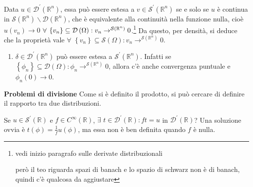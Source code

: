 \documentclass{article}
\begin{document}
Data $u\in \mathcal{D}^{\prime }\left( 
\mathbb{R}
^{n}\right) $, essa pu\`{o} essere estesa a $v\in \mathcal{S}^{\prime
}\left( 
\mathbb{R}
^{n}\right) $ se e solo se $u$ \`{e} continua in $\mathcal{S}\left( 
\mathbb{R}
^{n}\right) \backslash \mathcal{D}\left( 
\mathbb{R}
^{n}\right) $, che \`{e} equivalente alla continuit\`{a} nella funzione
nulla, cio\`{e} $u\left( v_{n}\right) \rightarrow 0$ $\forall $ $\left\{
v_{n}\right\} \subseteq \mathcal{D}\left( \Omega \right) :v_{n}\rightarrow ^{%
\mathcal{S}\left( 
\mathbb{R}
^{n}\right) }0$.\footnote{%
vedi inizio paragrafo sulle derivate distribuzionali
\par
per\`{o} il teo riguarda spazi di banach e lo spazio di schwarz non \`{e} di
banach, quindi c'\`{e} qualcosa da aggiustare} Da questo, per densit\`{a},
si deduce che la propriet\`{a} vale $\forall $ $\left\{ v_{n}\right\}
\subseteq \mathcal{S}\left( \Omega \right) :v_{n}\rightarrow ^{\mathcal{S}%
\left( 
\mathbb{R}
^{n}\right) }0$.

\begin{enumerate}
\item $\delta \in \mathcal{D}^{\prime }\left( 
\mathbb{R}
^{n}\right) $ pu\`{o} essere estesa a $\mathcal{S}^{\prime }\left( 
\mathbb{R}
^{n}\right) $. Infatti se $\left\{ \phi _{n}\right\} \subseteq \mathcal{D}%
\left( \Omega \right) :\phi _{n}\rightarrow ^{\mathcal{S}\left( 
\mathbb{R}
^{n}\right) }0$, allora c'\`{e} anche convergenza puntuale e $\phi
_{n}\left( 0\right) \rightarrow 0$.
\end{enumerate}

\textbf{Problemi di divisione} Come si \`{e} definito il prodotto, si pu\`{o}
cercare di definire il rapporto tra due distribuzioni.

Se $u\in \mathcal{S}^{\prime }\left( 
\mathbb{R}
\right) $ e $f\in C^{\infty }\left( 
\mathbb{R}
\right) $, $\exists $ $t\in \mathcal{D}^{\prime }\left( 
\mathbb{R}
\right) :ft=u$ in $\mathcal{D}^{\prime }\left( 
\mathbb{R}
\right) $? Una soluzione ovvia \`{e} $t\left( \phi \right) =\frac{1}{f}%
u\left( \phi \right) $, ma essa non \`{e} ben definita quando $f$ \`{e}
nulla.
\end{document}
